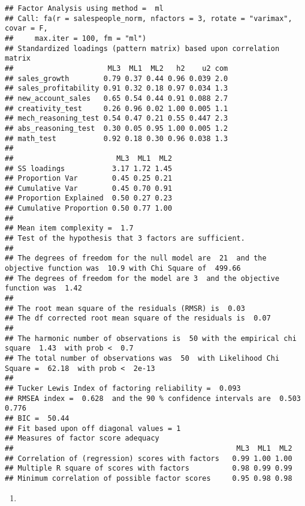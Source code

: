 \documentclass[
]{article}
\newenvironment{Shaded}{\begin{snugshade}}{\end{snugshade}}
\newcommand{\NormalTok}[1]{#1}
\newcommand{\SpecialCharTok}[1]{\textcolor[rgb]{0.00,0.00,0.00}{#1}}
\providecommand{\tightlist}{%
  \setlength{\itemsep}{0pt}\setlength{\parskip}{0pt}}
\begin{document}
\begin{verbatim}
## Factor Analysis using method =  ml
## Call: fa(r = salespeople_norm, nfactors = 3, rotate = "varimax", covar = F, 
##     max.iter = 100, fm = "ml")
## Standardized loadings (pattern matrix) based upon correlation matrix
##                      ML3  ML1  ML2   h2    u2 com
## sales_growth        0.79 0.37 0.44 0.96 0.039 2.0
## sales_profitability 0.91 0.32 0.18 0.97 0.034 1.3
## new_account_sales   0.65 0.54 0.44 0.91 0.088 2.7
## creativity_test     0.26 0.96 0.02 1.00 0.005 1.1
## mech_reasoning_test 0.54 0.47 0.21 0.55 0.447 2.3
## abs_reasoning_test  0.30 0.05 0.95 1.00 0.005 1.2
## math_test           0.92 0.18 0.30 0.96 0.038 1.3
## 
##                        ML3  ML1  ML2
## SS loadings           3.17 1.72 1.45
## Proportion Var        0.45 0.25 0.21
## Cumulative Var        0.45 0.70 0.91
## Proportion Explained  0.50 0.27 0.23
## Cumulative Proportion 0.50 0.77 1.00
## 
## Mean item complexity =  1.7
## Test of the hypothesis that 3 factors are sufficient.
## 
## The degrees of freedom for the null model are  21  and the objective function was  10.9 with Chi Square of  499.66
## The degrees of freedom for the model are 3  and the objective function was  1.42 
## 
## The root mean square of the residuals (RMSR) is  0.03 
## The df corrected root mean square of the residuals is  0.07 
## 
## The harmonic number of observations is  50 with the empirical chi square  1.43  with prob <  0.7 
## The total number of observations was  50  with Likelihood Chi Square =  62.18  with prob <  2e-13 
## 
## Tucker Lewis Index of factoring reliability =  0.093
## RMSEA index =  0.628  and the 90 % confidence intervals are  0.503 0.776
## BIC =  50.44
## Fit based upon off diagonal values = 1
## Measures of factor score adequacy             
##                                                    ML3  ML1  ML2
## Correlation of (regression) scores with factors   0.99 1.00 1.00
## Multiple R square of scores with factors          0.98 0.99 0.99
## Minimum correlation of possible factor scores     0.95 0.98 0.98
\end{verbatim}

\begin{enumerate}
\def\labelenumi{\alph{enumi}.}
\setcounter{enumi}{1}
\tightlist
\item
\end{enumerate}

\begin{Shaded}
\end{Shaded}
\end{document}
